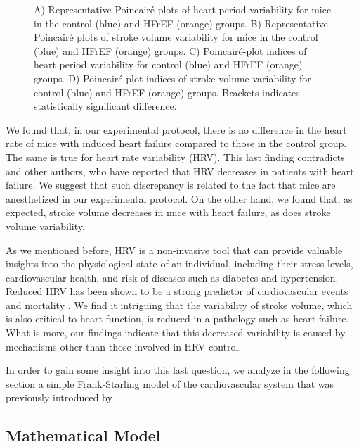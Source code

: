 \documentclass[%
preprint,
 amsmath,amssymb,
 aps,
]{revtex4-2}
\begin{document}
\begin{figure}[h!]
\begin{tabular}{cc}
    \end{tabular}
    \caption{A) Representative Poincairé plots of heart period variability for mice in the control (blue) and HFrEF (orange) groups. B) Representative Poincairé plots of stroke volume variability for mice in the control (blue) and HFrEF (orange) groups. C) Poincairé-plot indices of heart period variability for control (blue) and HFrEF (orange) groups. D) Poincairé-plot indices of stroke volume variability for control (blue) and HFrEF (orange) groups. Brackets indicates statistically significant difference.}
    \label{fig:fig02}
\end{figure}


We found that, in our experimental protocol, there is no difference in the heart rate of mice with induced heart failure compared to those in the control group. The same is true for heart rate variability (HRV). This last finding contradicts \citet{Kamen_1995} and other authors, who have reported that HRV decreases in patients with heart failure. We suggest that such discrepancy is related to the fact that mice are anesthetized in our experimental protocol. On the other hand, we found that, as expected, stroke volume decreases in mice with heart failure, as does stroke volume variability. 

As we mentioned before, HRV is a non-invasive tool that can provide valuable insights into the physiological state of an individual, including their stress levels, cardiovascular health, and risk of diseases such as diabetes and hypertension. Reduced HRV has been shown to be a strong predictor of cardiovascular events and mortality \citep{Zeki_Al_Hazzouri_2014}. We find it intriguing that the variability of stroke volume, which is also critical to heart function, is reduced in a pathology such as heart failure. What is more, our findings indicate that this decreased variability is caused by mechanisms other than those involved in HRV control. 

In order to gain some insight into this last question, we analyze in the following section a simple Frank-Starling model of the cardiovascular system that was previously introduced by \citet{Upton_2005}.

\subsection{Mathematical Model}
\end{document}
